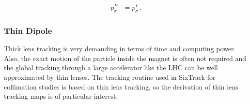 \begin{align}
%
p_\sigma^F & = p_\sigma^I \, .
\end{align} 


\subsubsection{Thin Dipole}
Thick lens tracking is very demanding in terms of time and computing power. Also, the exact motion of the particle inside the magnet is often not required and the global tracking through a large accelerator like the LHC can be well approximated by thin lenses. The tracking routine used in SixTrack for collimation studies is based on thin lens tracking, so the derivation of thin lens tracking maps is of particular interest. 

